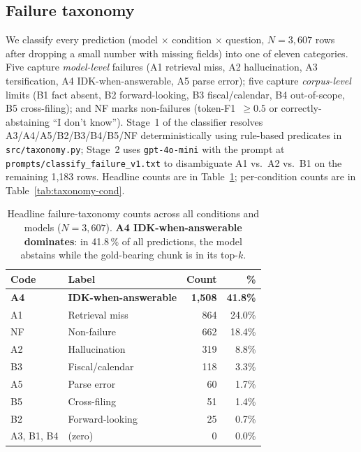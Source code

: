 \documentclass[11pt]{article}
\begin{document}
\subsection{Failure taxonomy}
\label{sec:taxonomy}
We classify every prediction (model $\times$ condition $\times$
question, $N=3{,}607$ rows after dropping a small number with missing
fields) into one of eleven categories. Five capture \emph{model-level}
failures (A1 retrieval miss, A2 hallucination, A3 tersification, A4
IDK-when-answerable, A5 parse error); five capture
\emph{corpus-level} limits (B1 fact absent, B2 forward-looking,
B3 fiscal/calendar, B4 out-of-scope, B5 cross-filing); and NF marks
non-failures (token-F1~$\geq 0.5$ or correctly-abstaining
``I don't know''). Stage~1 of the classifier resolves
A3/A4/A5/B2/B3/B4/B5/NF deterministically using rule-based predicates
in \texttt{src/taxonomy.py}; Stage~2 uses \texttt{gpt-4o-mini} with the
prompt at \texttt{prompts/classify\_failure\_v1.txt} to disambiguate
A1 vs.\ A2 vs.\ B1 on the remaining 1{,}183 rows. Headline counts are
in Table~\ref{tab:taxonomy-headline}; per-condition counts are in
Table~\ref{tab:taxonomy-cond}.

\begin{table}[h]
\centering
\small
\begin{tabular}{llrr}
\toprule
Code & Label & Count & \% \\
\midrule
\textbf{A4} & \textbf{IDK-when-answerable} & \textbf{1{,}508} & \textbf{41.8\%} \\
A1 & Retrieval miss              & 864   & 24.0\% \\
NF & Non-failure                 & 662   & 18.4\% \\
A2 & Hallucination               & 319   & 8.8\%  \\
B3 & Fiscal/calendar             & 118   & 3.3\%  \\
A5 & Parse error                 &  60   & 1.7\%  \\
B5 & Cross-filing                &  51   & 1.4\%  \\
B2 & Forward-looking             &  25   & 0.7\%  \\
A3, B1, B4 & (zero)              &   0   & 0.0\%  \\
\bottomrule
\end{tabular}
\caption{Headline failure-taxonomy counts across all conditions and
models ($N=3{,}607$). \textbf{A4 IDK-when-answerable dominates}: in
41.8\,\% of all predictions, the model abstains while the gold-bearing
chunk is in its top-$k$.}
\label{tab:taxonomy-headline}
\end{table}
\end{document}
